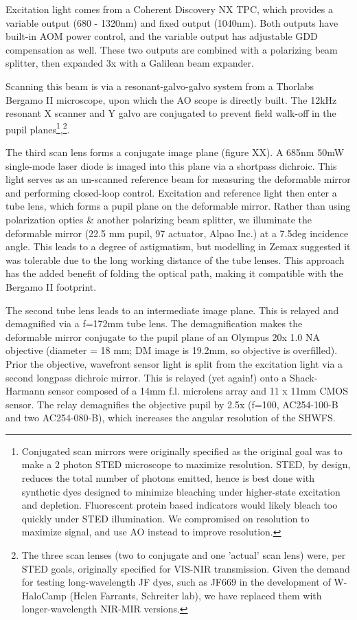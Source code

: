\documentclass[a4paper,10pt]{article}
\begin{document}
Excitation light comes from a Coherent Discovery NX TPC, which provides a variable output (680 - 1320nm) and fixed output (1040nm).  Both outputs have built-in AOM power control, and the variable output has adjustable GDD compensation as well.  These two outputs are combined with a polarizing beam splitter, then expanded 3x with a Galilean beam expander.  

Scanning this beam is via a resonant-galvo-galvo system from a Thorlabs Bergamo II microscope, upon which the AO scope is directly built.  The 12kHz resonant X scanner and Y galvo are conjugated to prevent field walk-off in the pupil planes\footnote{Conjugated scan mirrors were originally specified as the original goal was to make a 2 photon STED microscope to maximize resolution.  STED, by design, reduces the total number of photons emitted, hence is best done with synthetic dyes designed to minimize bleaching under higher-state excitation and depletion.  Fluorescent protein based indicators would likely bleach too quickly under STED illumination.  We compromised on resolution to maximize signal, and use AO instead to improve resolution. },\footnote{The three scan lenses (two to conjugate and one 'actual' scan lens) were, per STED goals, originally specified for VIS-NIR transmission.  Given the demand for testing long-wavelength JF dyes, such as JF669 in the development of W-HaloCamp (Helen Farrants, Schreiter lab), we have replaced them with longer-wavelength NIR-MIR versions.}.  

The third scan lens forms a conjugate image plane (figure XX).  A 685nm 50mW single-mode laser diode is imaged into this plane via a shortpass dichroic.  This light serves as an un-scanned reference beam for measuring the deformable mirror and performing closed-loop control.  Excitation and reference light then enter a tube lens, which forms a pupil plane on the deformable mirror.  Rather than using polarization optics \& another polarizing beam splitter, we illuminate the deformable mirror (22.5 mm pupil, 97 actuator, Alpao Inc.) at a 7.5deg incidence angle.  This leads to a degree of astigmatism, but modelling in Zemax suggested it was tolerable due to the long working distance of the tube lenses.  This approach has the added benefit of folding the optical path, making it compatible with the Bergamo II footprint.  

The second tube lens leads to an intermediate image plane.  This is relayed and demagnified via a f=172mm tube lens.  The demagnification makes the deformable mirror conjugate to the pupil plane of an Olympus 20x 1.0 NA objective (diameter = 18 mm; DM image is 19.2mm, so objective is overfilled).  Prior the objective, wavefront sensor light is split from the excitation light via a second longpass dichroic mirror.  This is relayed (yet again!) onto a Shack-Harmann sensor composed of a 14mm f.l. microlens array and 11 x 11mm CMOS sensor.  The relay demagnifies the objective pupil by 2.5x (f=100, AC254-100-B and two AC254-080-B), which increases the angular resolution of the SHWFS.  
\end{document}
